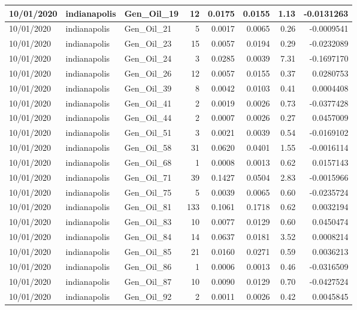 \documentclass[
  letterpaper,
  DIV=11,
  numbers=noendperiod]{scrartcl}
\begin{document}
\begin{tabular}{l|l|l|r|r|r|r|r}
\hline
10/01/2020 & indianapolis & Gen\_Oil\_19 & 12 & 0.0175 & 0.0155 & 1.13 & -0.0131263\\
\hline
10/01/2020 & indianapolis & Gen\_Oil\_21 & 5 & 0.0017 & 0.0065 & 0.26 & -0.0009541\\
\hline
10/01/2020 & indianapolis & Gen\_Oil\_23 & 15 & 0.0057 & 0.0194 & 0.29 & -0.0232089\\
\hline
10/01/2020 & indianapolis & Gen\_Oil\_24 & 3 & 0.0285 & 0.0039 & 7.31 & -0.1697170\\
\hline
10/01/2020 & indianapolis & Gen\_Oil\_26 & 12 & 0.0057 & 0.0155 & 0.37 & 0.0280753\\
\hline
10/01/2020 & indianapolis & Gen\_Oil\_39 & 8 & 0.0042 & 0.0103 & 0.41 & 0.0004408\\
\hline
10/01/2020 & indianapolis & Gen\_Oil\_41 & 2 & 0.0019 & 0.0026 & 0.73 & -0.0377428\\
\hline
10/01/2020 & indianapolis & Gen\_Oil\_44 & 2 & 0.0007 & 0.0026 & 0.27 & 0.0457009\\
\hline
10/01/2020 & indianapolis & Gen\_Oil\_51 & 3 & 0.0021 & 0.0039 & 0.54 & -0.0169102\\
\hline
10/01/2020 & indianapolis & Gen\_Oil\_58 & 31 & 0.0620 & 0.0401 & 1.55 & -0.0016114\\
\hline
10/01/2020 & indianapolis & Gen\_Oil\_68 & 1 & 0.0008 & 0.0013 & 0.62 & 0.0157143\\
\hline
10/01/2020 & indianapolis & Gen\_Oil\_71 & 39 & 0.1427 & 0.0504 & 2.83 & -0.0015966\\
\hline
10/01/2020 & indianapolis & Gen\_Oil\_75 & 5 & 0.0039 & 0.0065 & 0.60 & -0.0235724\\
\hline
10/01/2020 & indianapolis & Gen\_Oil\_81 & 133 & 0.1061 & 0.1718 & 0.62 & 0.0032194\\
\hline
10/01/2020 & indianapolis & Gen\_Oil\_83 & 10 & 0.0077 & 0.0129 & 0.60 & 0.0450474\\
\hline
10/01/2020 & indianapolis & Gen\_Oil\_84 & 14 & 0.0637 & 0.0181 & 3.52 & 0.0008214\\
\hline
10/01/2020 & indianapolis & Gen\_Oil\_85 & 21 & 0.0160 & 0.0271 & 0.59 & 0.0036213\\
\hline
10/01/2020 & indianapolis & Gen\_Oil\_86 & 1 & 0.0006 & 0.0013 & 0.46 & -0.0316509\\
\hline
10/01/2020 & indianapolis & Gen\_Oil\_87 & 10 & 0.0090 & 0.0129 & 0.70 & -0.0427524\\
\hline
10/01/2020 & indianapolis & Gen\_Oil\_92 & 2 & 0.0011 & 0.0026 & 0.42 & 0.0045845\\

\end{tabular}
\end{document}
